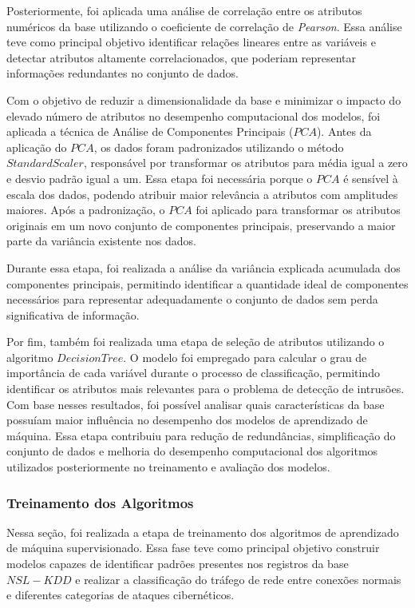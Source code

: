 \documentclass[a4paper,10pt, twocolumn]{article}
\begin{document}
Posteriormente, foi aplicada 
uma análise de correlação entre os atributos numéricos da base utilizando o 
coeficiente de correlação de \textit{Pearson}. Essa análise teve como principal objetivo 
identificar relações lineares entre as variáveis e detectar atributos altamente 
correlacionados, que poderiam representar informações redundantes no conjunto 
de dados. 

Com o objetivo de reduzir a dimensionalidade da base e minimizar o impacto do 
elevado número de atributos no desempenho computacional dos modelos, foi 
aplicada a técnica de Análise de Componentes Principais ($PCA$). Antes da 
aplicação do $PCA$, os dados foram padronizados utilizando o método \textit{$StandardScaler$}, 
responsável por transformar os atributos para média igual a zero e desvio padrão 
igual a um. Essa etapa foi necessária porque o $PCA$ é sensível à escala dos dados, 
podendo atribuir maior relevância a atributos com amplitudes maiores. Após a 
padronização, o $PCA$ foi aplicado para transformar os atributos originais em um 
novo conjunto de componentes principais, preservando a maior parte da variância 
existente nos dados. 

Durante essa etapa, foi realizada a análise da variância explicada acumulada dos 
componentes principais, permitindo identificar a quantidade ideal de componentes 
necessários para representar adequadamente o conjunto de dados sem perda 
significativa de informação. 

Por fim, também foi realizada uma etapa de seleção de atributos utilizando o 
algoritmo \textit{$Decision Tree$}. O modelo foi empregado para calcular o grau de importância 
de cada variável durante o processo de classificação, permitindo identificar os 
atributos mais relevantes para o problema de detecção de intrusões. Com base nesses 
resultados, foi possível analisar quais características da base possuíam maior 
influência no desempenho dos modelos de aprendizado de máquina. Essa etapa 
contribuiu para redução de redundâncias, simplificação do conjunto de dados e 
melhoria do desempenho computacional dos algoritmos utilizados posteriormente 
no treinamento e avaliação dos modelos.

\subsubsection{Treinamento dos Algoritmos}
Nessa seção, foi realizada a etapa de treinamento dos algoritmos de aprendizado 
de máquina supervisionado. Essa fase teve como principal objetivo construir 
modelos capazes de identificar padrões presentes nos registros da base $NSL-KDD$ 
e realizar a classificação do tráfego de rede entre conexões normais e 
diferentes categorias de ataques cibernéticos.
\end{document}
